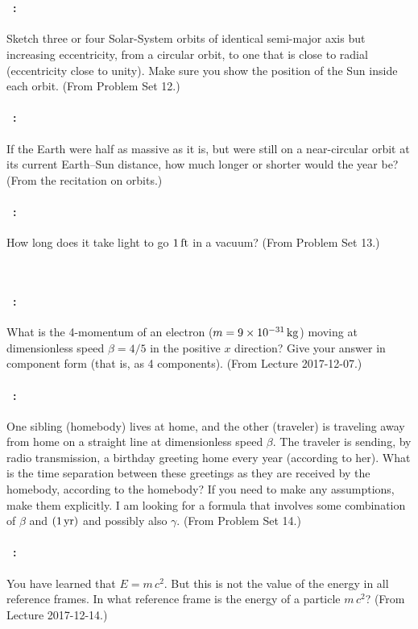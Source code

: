 \documentclass[12pt]{article} 
\begin{document}
\vfill
~
\clearpage

\paragraph{\problemname~\theproblem:}%
Sketch three or four Solar-System orbits of identical semi-major axis but increasing
eccentricity, from a circular orbit, to one that is close to radial
(eccentricity close to unity). Make sure you show the position of
the Sun inside each orbit.
(From Problem Set 12.)

\vfill

\paragraph{\problemname~\theproblem:}%
If the Earth were half as massive as it is, but were still
on a near-circular orbit at its current Earth--Sun distance, how much
longer or shorter would the year be?
(From the recitation on orbits.)

\vfill

\paragraph{\problemname~\theproblem:}%
How long does it take light to go $1\,\mathrm{ft}$ in a vacuum?
(From Problem Set 13.)

\vfill
~
\clearpage

\paragraph{\problemname~\theproblem:}%
What is the 4-momentum of an electron ($m = 9\times 10^{-31}\,\mathrm{kg}$)
moving at dimensionless speed $\beta = 4/5$ in the positive $x$
direction? Give your answer in component form (that is, as 4 components).
(From Lecture 2017-12-07.)

\vfill

\paragraph{\problemname~\theproblem:}%
One sibling (homebody) lives at home, and the other (traveler) is
traveling away from home on a straight line at dimensionless speed $\beta$. The traveler
is sending, by radio transmission, a birthday greeting home every year
(according to her). What is the time separation between these
greetings as they are received by the homebody, according to the
homebody? If you need to make any assumptions, make them explicitly.
I am looking for a formula that involves some combination of $\beta$
and $(1\,\mathrm{yr})$ and possibly also $\gamma$.
(From Problem Set 14.)

\vfill

\paragraph{\problemname~\theproblem:}%
You have learned that $E=m\,c^2$. But this is not
the value of the energy in all reference frames. In what reference
frame is the energy of a particle $m\,c^2$?
(From Lecture 2017-12-14.)

\vfill
~
\end{document}
